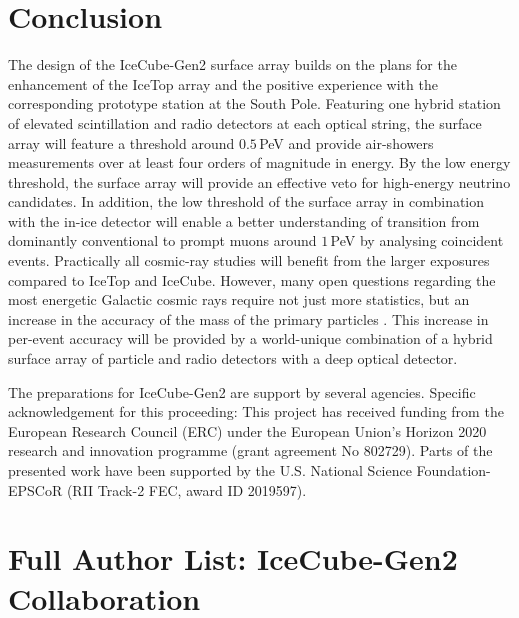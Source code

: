 \documentclass[a4paper,11pt]{article}
\begin{document}
\section{Conclusion}
The design of the IceCube-Gen2 surface array builds on the plans for the enhancement of the IceTop array and the positive experience with the corresponding prototype station at the South Pole.
Featuring one hybrid station of elevated scintillation and radio detectors at each optical string, the surface array will feature a threshold around $0.5\,$PeV and provide air-showers measurements over at least four orders of magnitude in energy. 
By the low energy threshold, the surface array will provide an effective veto for high-energy neutrino candidates. In addition, the low threshold of the surface array in combination with the in-ice detector will enable a better understanding of transition from dominantly conventional to prompt muons around $1\,$PeV by analysing coincident events.
Practically all cosmic-ray studies will benefit from the larger exposures compared to IceTop and IceCube.
However, many open questions regarding the most energetic Galactic cosmic rays require not just more statistics, but an increase in the accuracy of the mass of the primary particles \cite{Astro2020_GCR_WhitePaper}.
This increase in per-event accuracy will be provided by a world-unique combination of a hybrid surface array of particle and radio detectors with a deep optical detector.  




\vspace{5mm}
\noindent
\footnotesize{The preparations for IceCube-Gen2 are support by several agencies. Specific acknowledgement for this proceeding: This project has received funding from the European Research Council (ERC) under the European Union's Horizon 2020 research and innovation programme (grant agreement No 802729). Parts of the presented work have been supported by the U.S. National Science Foundation-EPSCoR (RII Track-2 FEC, award ID 2019597).}




\clearpage
\section*{Full Author List: IceCube-Gen2 Collaboration}
\end{document}
